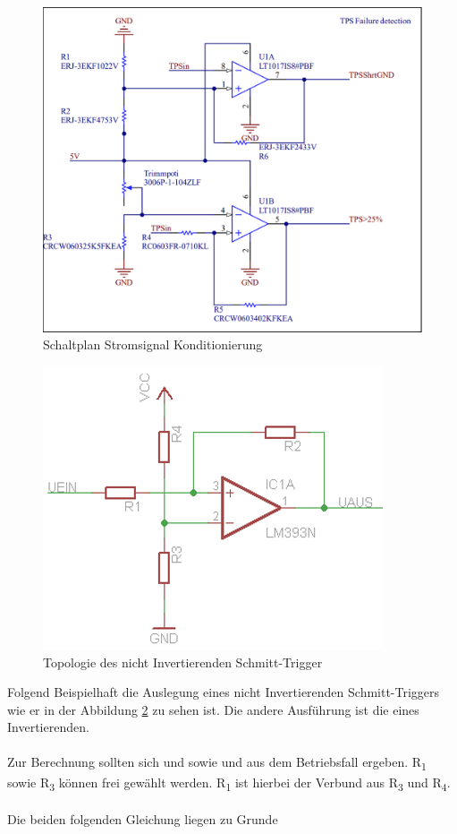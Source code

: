 \begin{figure}
	\centering
	\includegraphics[width=0.7\linewidth]{"bilder/TPS Failure detection"}
	\caption{Schaltplan Stromsignal Konditionierung}
	\label{fig:tps-failure-detection}
\end{figure}

\begin{figure}
	\centering
	\includegraphics[width=0.5\linewidth]{"bilder/nichtinvertierender Trigger"}
	\caption{Topologie des nicht Invertierenden Schmitt-Trigger \cite{Schmitt Trigger Mikrocontroller.net}}
	\label{fig:nichtinvertierender-trigger}
\end{figure}

Folgend Beispielhaft die Auslegung eines nicht Invertierenden Schmitt-Triggers wie er in der Abbildung \ref{fig:nichtinvertierender-trigger} zu sehen ist. Die andere Ausführung ist die eines Invertierenden.
\\
\\
Zur Berechnung sollten sich  und  sowie  und  aus dem Betriebsfall ergeben. R\textsubscript{1} sowie R\textsubscript{3} können frei gewählt werden. R\textsubscript{1} ist hierbei der Verbund aus R\textsubscript{3} und R\textsubscript{4}.
\\
\\
Die beiden folgenden Gleichung liegen zu Grunde


